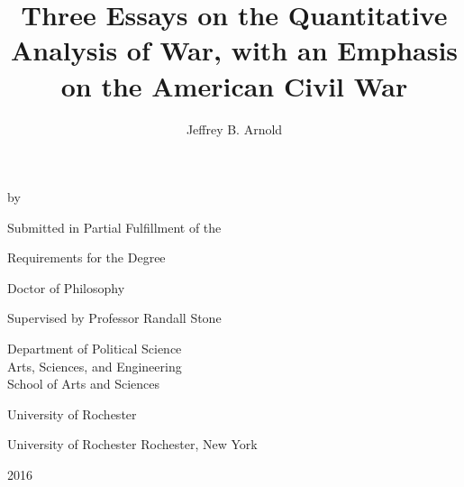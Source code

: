 \documentclass[12pt,oneside,openright]{memoir}
\author{Jeffrey B. Arnold}
\title{Three Essays on the Quantitative Analysis of War, with an Emphasis on the American Civil War}
\newcommand{\dissYear}{2016}
\newcommand{\dissAdvisorName}{Randall Stone}
\newcommand{\dissAdvisorDepartment}{Department of Political Science \\%
 Arts, Sciences, and Engineering \\%
 School of Arts and Sciences%
 }
\newcommand{\dissAdvisorInstitution}{University of Rochester}
\begin{document}
\begin{titlingpage}
  \vspace*{\fill}

  \begin{center}
    {\LARGE \bfseries
      \thetitle
      \par
    }
  \end{center}

  \bigskip%
  \begin{center}
    by
  \end{center}

  \bigskip%
  \begin{center}
    \theauthor
  \end{center}


  \begin{center}
    \bigskip\bigskip\bigskip\bigskip%
    Submitted in Partial Fulfillment of the

    \bigskip%
    Requirements for the Degree

    \bigskip%
    Doctor of Philosophy
  \end{center}


  \begin{center}
    \bigskip\bigskip\bigskip\bigskip%
    Supervised by Professor \dissAdvisorName{} 

    \bigskip\bigskip%
    \dissAdvisorDepartment{}

    \bigskip%
    \dissAdvisorInstitution{}
  \end{center}

  \bigskip\bigskip\bigskip\bigskip%
  \begin{center}
    University of Rochester
    Rochester, New York
  \end{center}


  \bigskip\bigskip\bigskip\bigskip%
  \begin{center}
    \dissYear{}
  \end{center}

  \vspace*{\fill}
\end{titlingpage}

\setcounter{page}{2}

\DoubleSpacing
\end{document}

